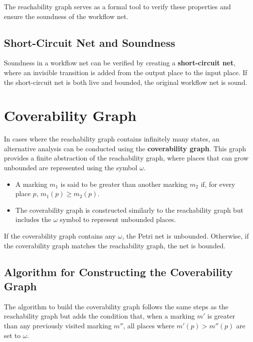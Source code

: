     The reachability graph serves as a formal tool to verify these properties and ensure the soundness of the workflow net.
    
    \subsection{Short-Circuit Net and Soundness}
    Soundness in a workflow net can be verified by creating a \textbf{short-circuit net}, where an invisible transition is added from the output place to the input place. If the short-circuit net is both live and bounded, the original workflow net is sound.
    
    \section{Coverability Graph}
    In cases where the reachability graph contains infinitely many states, an alternative analysis can be conducted using the \textbf{coverability graph}. This graph provides a finite abstraction of the reachability graph, where places that can grow unbounded are represented using the symbol $\omega$.
    \begin{itemize}
        \item A marking $m_1$ is said to be greater than another marking $m_2$ if, for every place $p$, $m_1(p) \geq m_2(p)$.
        \item The coverability graph is constructed similarly to the reachability graph but includes the $\omega$ symbol to represent unbounded places.
    \end{itemize}
    If the coverability graph contains any $\omega$, the Petri net is unbounded. Otherwise, if the coverability graph matches the reachability graph, the net is bounded.
    
    \subsection{Algorithm for Constructing the Coverability Graph}
    The algorithm to build the coverability graph follows the same steps as the reachability graph but adds the condition that, when a marking $m'$ is greater than any previously visited marking $m''$, all places where $m'(p) > m''(p)$ are set to $\omega$.
    
